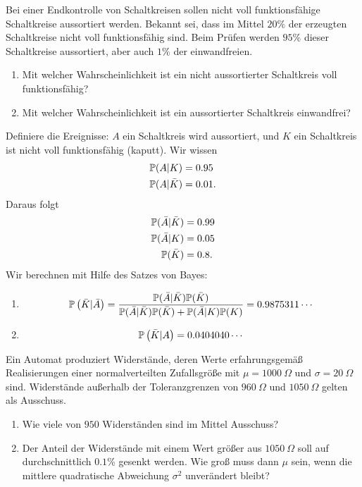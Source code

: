  Bei einer Endkontrolle von
Schaltkreisen sollen nicht voll funktionsfähige Schaltkreise aussortiert
werden. Bekannt sei, dass im Mittel $20\%$ der erzeugten Schaltkreise nicht
voll funktionsfähig sind. Beim Prüfen werden $95\%$ dieser Schaltkreise
aussortiert, aber auch $1\%$ der einwandfreien.
\begin{enumerate}
    \item Mit welcher Wahrscheinlichkeit ist ein nicht aussortierter
        Schaltkreis voll funktionsfähig?
    \item Mit welcher Wahrscheinlichkeit ist ein aussortierter Schaltkreis
        einwandfrei?
\end{enumerate}

\solution 
Definiere die Ereignisse: $A$ ein Schaltkreis wird aussortiert, und $K$ ein Schaltkreis ist
nicht voll funktionsfähig (kaputt). Wir wissen
\begin{align*}
    \mathbb P( A | K ) &= 0.95 \\
    \mathbb P( A | \bar K ) &= 0.01.
\end{align*}
Daraus folgt
\begin{align*}
    \mathbb P( \bar A | \bar K ) &= 0.99 \\
    \mathbb P( \bar A | K ) &= 0.05 \\
    \mathbb P( \bar K ) &= 0.8.
\end{align*}
Wir berechnen mit Hilfe des Satzes von Bayes:
\begin{enumerate}
    \item \begin{equation*}
            \mathbb P\left( \bar K | \bar A \right) = \frac{\mathbb P(\bar A | \bar K)\mathbb P(\bar K)}
            {\mathbb P(\bar A | \bar K)\mathbb P(\bar K) + \mathbb P(\bar A | K ) \mathbb P(K)} = 0.9875311\cdots
        \end{equation*}
    \item \begin{equation*}
            \mathbb P\left( \bar K | A \right) = 0.0404040\cdots
        \end{equation*}
\end{enumerate}

 Ein Automat produziert Widerstände, deren Werte
erfahrungsgemäß Realisierungen einer normalverteilten Zufallsgröße mit $\mu =
1000\ \Omega$ und $\sigma = 20\ \Omega$ sind. Widerstände außerhalb der
Toleranzgrenzen von $960\ \Omega$ und $1050\ \Omega$ gelten als Ausschuss.
\begin{enumerate}
    \item Wie viele von $950$ Widerständen sind im Mittel Ausschuss?
    \item Der Anteil der Widerstände mit einem Wert größer aus $1050\ \Omega$
        soll auf durchschnittlich $0.1\%$ gesenkt werden. Wie groß muss dann
        $\mu$ sein, wenn die mittlere quadratische Abweichung $\sigma^2$
        unverändert bleibt?
\end{enumerate}

